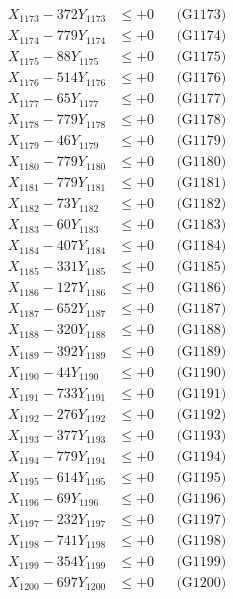\documentclass[a4paper,10pt]{article}
\begin{document}
{\begin{align}
X_{1173} - 372Y_{1173} &\leq +0 && \text{(G1173)} \\
X_{1174} - 779Y_{1174} &\leq +0 && \text{(G1174)} \\
X_{1175} - 88Y_{1175} &\leq +0 && \text{(G1175)} \\
X_{1176} - 514Y_{1176} &\leq +0 && \text{(G1176)} \\
X_{1177} - 65Y_{1177} &\leq +0 && \text{(G1177)} \\
X_{1178} - 779Y_{1178} &\leq +0 && \text{(G1178)} \\
X_{1179} - 46Y_{1179} &\leq +0 && \text{(G1179)} \\
X_{1180} - 779Y_{1180} &\leq +0 && \text{(G1180)} \\
\allowbreak
X_{1181} - 779Y_{1181} &\leq +0 && \text{(G1181)} \\
X_{1182} - 73Y_{1182} &\leq +0 && \text{(G1182)} \\
X_{1183} - 60Y_{1183} &\leq +0 && \text{(G1183)} \\
X_{1184} - 407Y_{1184} &\leq +0 && \text{(G1184)} \\
X_{1185} - 331Y_{1185} &\leq +0 && \text{(G1185)} \\
X_{1186} - 127Y_{1186} &\leq +0 && \text{(G1186)} \\
X_{1187} - 652Y_{1187} &\leq +0 && \text{(G1187)} \\
X_{1188} - 320Y_{1188} &\leq +0 && \text{(G1188)} \\
X_{1189} - 392Y_{1189} &\leq +0 && \text{(G1189)} \\
X_{1190} - 44Y_{1190} &\leq +0 && \text{(G1190)} \\
\allowbreak
X_{1191} - 733Y_{1191} &\leq +0 && \text{(G1191)} \\
X_{1192} - 276Y_{1192} &\leq +0 && \text{(G1192)} \\
X_{1193} - 377Y_{1193} &\leq +0 && \text{(G1193)} \\
X_{1194} - 779Y_{1194} &\leq +0 && \text{(G1194)} \\
X_{1195} - 614Y_{1195} &\leq +0 && \text{(G1195)} \\
X_{1196} - 69Y_{1196} &\leq +0 && \text{(G1196)} \\
X_{1197} - 232Y_{1197} &\leq +0 && \text{(G1197)} \\
X_{1198} - 741Y_{1198} &\leq +0 && \text{(G1198)} \\
X_{1199} - 354Y_{1199} &\leq +0 && \text{(G1199)} \\
X_{1200} - 697Y_{1200} &\leq +0 && \text{(G1200)} \\

\end{align}}
\end{document}
